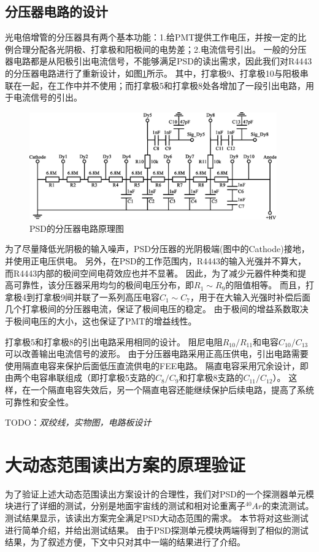 \subsection{分压器电路的设计}
\label{sec:dynamic_range:hv_divider}
光电倍增管的分压器具有两个基本功能：1.给PMT提供工作电压，并按一定的比例合理分配各光阴极、打拿极和阳极间的电势差；2.电流信号引出。
一般的分压器电路都是从阳极引出电流信号，不能够满足PSD的读出需求，因此我们对R4443的分压器电路进行了重新设计，如图\ref{fig:dynamic_range:divider}所示。
其中，打拿极9、打拿极10与阳极串联在一起，在工作中并不使用；而打拿极5和打拿极8处各增加了一段引出电路，用于电流信号的引出。
\begin{figure}[!htbp]
	\centering
	\includegraphics[width=0.95\textwidth]{chap/dynamic_range/fig/divider.eps}
	\caption{PSD的分压器电路原理图}
	\label{fig:dynamic_range:divider}
\end{figure}

为了尽量降低光阴极的输入噪声，PSD分压器的光阴极端(图中的Cathode)接地，并使用正电压供电。
另外，在PSD的工作范围内，R4443的输入光强并不算大，而R4443内部的极间空间电荷效应也并不显著。
因此，为了减少元器件种类和提高可靠性，该分压器采用均匀的极间电压分布，即$R_1 \sim R_9$的阻值相等。
而且，打拿极4到打拿极9间并联了一系列高压电容$C_1 \sim C_7$，用于在大输入光强时补偿后面几个打拿极间的分压器电流，保证了极间电压的稳定。
由于极间的增益系数取决于极间电压的大小，这也保证了PMT的增益线性。

打拿极5和打拿极8的引出电路采用相同的设计。
阻尼电阻$R_{10}/R_{11}$和电容$C_{10}/C_{13}$可以改善输出电流信号的波形。
由于分压器电路采用正高压供电，引出电路需要使用隔直电容来保护后面低压直流供电的FEE电路。
隔直电容采用冗余设计，即由两个电容串联组成（即打拿极5支路的$C_8/C_9$和打拿极8支路的$C_{11}/C_{12}$）。
这样，在一个隔直电容失效后，另一个隔直电容还能继续保护后续电路，提高了系统可靠性和安全性。

TODO：\emph{双绞线，实物图，电路板设计}

\section{大动态范围读出方案的原理验证}
\label{sec:dynamic_range:verification}
为了验证上述大动态范围读出方案设计的合理性，我们对PSD的一个探测器单元模块进行了详细的测试，分别是地面宇宙线的测试和相对论重离子$^{40}Ar$的束流测试。
测试结果显示，该读出方案完全满足PSD大动态范围的需求。
本节将对这些测试进行简单介绍，并给出测试结果。
由于PSD探测单元模块两端得到了相似的测试结果，为了叙述方便，下文中只对其中一端的结果进行了介绍。

